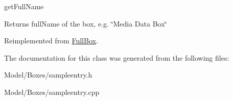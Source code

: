 get\-Full\-Name 

\begin{DoxyReturn}{Returns}
full\-Name of the box, e.\-g. \char`\"{}\-Media Data Box\char`\"{} 
\end{DoxyReturn}


Reimplemented from \hyperlink{class_full_box_a0701464d8e7386653f025833308f76ee}{Full\-Box}.



The documentation for this class was generated from the following files\-:\begin{DoxyCompactItemize}
\item 
Model/\-Boxes/sampleentry.\-h\item 
Model/\-Boxes/sampleentry.\-cpp\end{DoxyCompactItemize}
